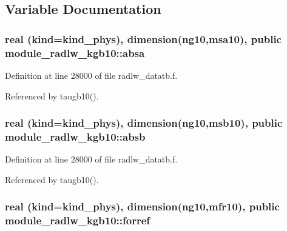 \subsection{Variable Documentation}
\subsubsection[{\texorpdfstring{absa}{absa}}]{\setlength{\rightskip}{0pt plus 5cm}real (kind=kind\+\_\+phys), dimension(ng10,{\bf msa10}), public module\+\_\+radlw\+\_\+kgb10\+::absa}\hypertarget{namespacemodule__radlw__kgb10_a14f18538f77c1a3d651e36acf90baa19}{}\label{namespacemodule__radlw__kgb10_a14f18538f77c1a3d651e36acf90baa19}


Definition at line 28000 of file radlw\+\_\+datatb.\+f.



Referenced by taugb10().

\subsubsection[{\texorpdfstring{absb}{absb}}]{\setlength{\rightskip}{0pt plus 5cm}real (kind=kind\+\_\+phys), dimension(ng10,{\bf msb10}), public module\+\_\+radlw\+\_\+kgb10\+::absb}\hypertarget{namespacemodule__radlw__kgb10_af1e2252355a3002080be21ce37d45c3a}{}\label{namespacemodule__radlw__kgb10_af1e2252355a3002080be21ce37d45c3a}


Definition at line 28000 of file radlw\+\_\+datatb.\+f.



Referenced by taugb10().

\subsubsection[{\texorpdfstring{forref}{forref}}]{\setlength{\rightskip}{0pt plus 5cm}real (kind=kind\+\_\+phys), dimension(ng10,{\bf mfr10}), public module\+\_\+radlw\+\_\+kgb10\+::forref}\hypertarget{namespacemodule__radlw__kgb10_af70e39048d571053790289549dd8333a}{}\label{namespacemodule__radlw__kgb10_af70e39048d571053790289549dd8333a}



